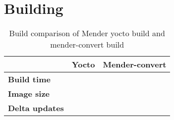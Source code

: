 \documentclass[../../main.tex]{subfiles}
\begin{document}
\section{Building}%
\label{sec:building}

\begin{table}[h]
	\centering
	\caption{Build comparison of Mender yocto build and mender-convert build}
	\label{tab:build_comp}
	\begin{tabular}{l|cc}
		& \textbf{Yocto} & \textbf{Mender-convert}\\
		\hline
		\textbf{Build time}&&\\
		\textbf{Image size}&&\\
		\textbf{Delta updates}&&
	\end{tabular}
\end{table}
\end{document}
